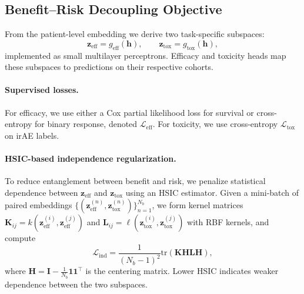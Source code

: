 \documentclass{article}
\begin{document}
\subsection{Benefit--Risk Decoupling Objective}
\label{subsec:decouple}

From the patient-level embedding we derive two task-specific subspaces:
\begin{equation}
\mathbf{z}_{\mathrm{eff}} = g_{\mathrm{eff}}(\mathbf{h}), \qquad
\mathbf{z}_{\mathrm{tox}} = g_{\mathrm{tox}}(\mathbf{h}),
\end{equation}
implemented as small multilayer perceptrons.
Efficacy and toxicity heads map these subspaces to predictions on their respective cohorts.

\paragraph{Supervised losses.}
For efficacy, we use either a Cox partial likelihood loss for survival or cross-entropy for binary response,
denoted $\mathcal{L}_{\mathrm{eff}}$.
For toxicity, we use cross-entropy $\mathcal{L}_{\mathrm{tox}}$ on irAE labels.

\paragraph{HSIC-based independence regularization.}
To reduce entanglement between benefit and risk, we penalize statistical dependence between
$\mathbf{z}_{\mathrm{eff}}$ and $\mathbf{z}_{\mathrm{tox}}$ using an HSIC estimator.
Given a mini-batch of paired embeddings
$\{(\mathbf{z}_{\mathrm{eff}}^{(n)},\mathbf{z}_{\mathrm{tox}}^{(n)})\}_{n=1}^{N_b}$,
we form kernel matrices
$\mathbf{K}_{ij}=k(\mathbf{z}_{\mathrm{eff}}^{(i)},\mathbf{z}_{\mathrm{eff}}^{(j)})$ and
$\mathbf{L}_{ij}=\ell(\mathbf{z}_{\mathrm{tox}}^{(i)},\mathbf{z}_{\mathrm{tox}}^{(j)})$
with RBF kernels, and compute
\begin{equation}
\mathcal{L}_{\mathrm{ind}}
=\frac{1}{(N_b-1)^2}\mathrm{tr}(\mathbf{K}\mathbf{H}\mathbf{L}\mathbf{H}),
\end{equation}
where $\mathbf{H}=\mathbf{I}-\tfrac{1}{N_b}\mathbf{1}\mathbf{1}^\top$ is the centering matrix.
Lower HSIC indicates weaker dependence between the two subspaces.
\end{document}
